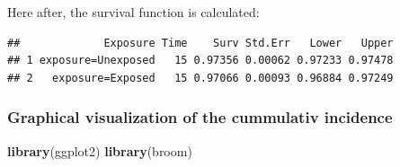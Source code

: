 \documentclass[
]{article}
\newenvironment{Shaded}{\begin{snugshade}}{\end{snugshade}}
\newcommand{\AttributeTok}[1]{\textcolor[rgb]{0.13,0.29,0.53}{#1}}
\newcommand{\CommentTok}[1]{\textcolor[rgb]{0.56,0.35,0.01}{\textit{#1}}}
\newcommand{\DecValTok}[1]{\textcolor[rgb]{0.00,0.00,0.81}{#1}}
\newcommand{\FunctionTok}[1]{\textcolor[rgb]{0.13,0.29,0.53}{\textbf{#1}}}
\newcommand{\NormalTok}[1]{#1}
\newcommand{\OtherTok}[1]{\textcolor[rgb]{0.56,0.35,0.01}{#1}}
\newcommand{\SpecialCharTok}[1]{\textcolor[rgb]{0.81,0.36,0.00}{\textbf{#1}}}
\newcommand{\StringTok}[1]{\textcolor[rgb]{0.31,0.60,0.02}{#1}}
\begin{document}
Here after, the survival function is calculated:

\begin{Shaded}
\end{Shaded}

\begin{verbatim}
##             Exposure Time    Surv Std.Err   Lower   Upper
## 1 exposure=Unexposed   15 0.97356 0.00062 0.97233 0.97478
## 2   exposure=Exposed   15 0.97066 0.00093 0.96884 0.97249
\end{verbatim}

\subsubsection{Graphical visualization of the cummulativ
incidence}\label{graphical-visualization-of-the-cummulativ-incidence}

\begin{Shaded}
\begin{Highlighting}[]
\FunctionTok{library}\NormalTok{(ggplot2)}
\FunctionTok{library}\NormalTok{(broom)}
\end{Highlighting}
\end{Shaded}
\end{document}

